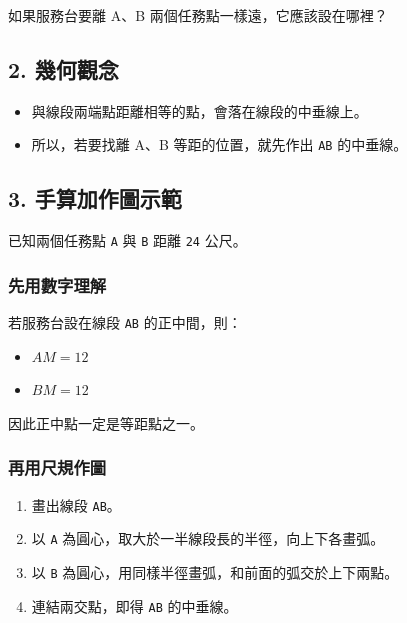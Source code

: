 \documentclass[
  chinese,
  12pt,
  a4paper,
  oneside]{article}
\providecommand{\tightlist}{%
  \setlength{\itemsep}{0pt}\setlength{\parskip}{0pt}}
\begin{document}
如果服務台要離 A、B 兩個任務點一樣遠，它應該設在哪裡？

\subsection{2. 幾何觀念}\label{ux5e7eux4f55ux89c0ux5ff5}

\begin{itemize}
\tightlist
\item
  與線段兩端點距離相等的點，會落在線段的中垂線上。
\item
  所以，若要找離 A、B 等距的位置，就先作出 \texttt{AB} 的中垂線。
\end{itemize}

\subsection{3.
手算加作圖示範}\label{ux624bux7b97ux52a0ux4f5cux5716ux793aux7bc4}

已知兩個任務點 \texttt{A} 與 \texttt{B} 距離 \texttt{24} 公尺。

\subsubsection{先用數字理解}\label{ux5148ux7528ux6578ux5b57ux7406ux89e3}

若服務台設在線段 \texttt{AB} 的正中間，則：

\begin{itemize}
\tightlist
\item
  \(AM = 12\)
\item
  \(BM = 12\)
\end{itemize}

因此正中點一定是等距點之一。

\subsubsection{再用尺規作圖}\label{ux518dux7528ux5c3aux898fux4f5cux5716}

\begin{enumerate}
\def\labelenumi{\arabic{enumi}.}
\tightlist
\item
  畫出線段 \texttt{AB}。
\item
  以 \texttt{A} 為圓心，取大於一半線段長的半徑，向上下各畫弧。
\item
  以 \texttt{B} 為圓心，用同樣半徑畫弧，和前面的弧交於上下兩點。
\item
  連結兩交點，即得 \texttt{AB} 的中垂線。
\end{enumerate}
\end{document}
